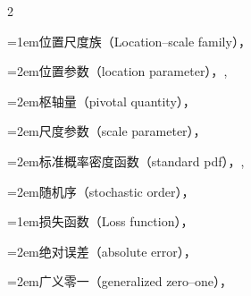 \begin{multicols}{2}
\par\addvspace{2pt}
\par\noindent\hangindent=1em\hspace*{0em}\label{idx:647}位置尺度族（Location–scale family），\hyperref[sec:3.5]{\pageref*{sec:3.5}}\par
\par\noindent\hangindent=2em\hspace*{1em}\label{idx:648}位置参数（location parameter），\hyperref[def:3.5.2]{\pageref*{def:3.5.2}}, \hyperref[def:3.5.5]{\pageref*{def:3.5.5}}\par
\par\noindent\hangindent=2em\hspace*{1em}\label{idx:649}枢轴量（pivotal quantity），\hyperref[ex:9.2.7]{\pageref*{ex:9.2.7}}\par
\par\noindent\hangindent=2em\hspace*{1em}\label{idx:650}尺度参数（scale parameter），\hyperref[def:3.5.4]{\pageref*{def:3.5.4}}\par
\par\noindent\hangindent=2em\hspace*{1em}\label{idx:651}标准概率密度函数（standard pdf），\hyperref[idxocc:651:126]{\pageref*{idxocc:651:126}}, \hyperref[def:3.5.5]{\pageref*{def:3.5.5}}\par
\par\noindent\hangindent=2em\hspace*{1em}\label{idx:652}随机序（stochastic order），\hyperref[exercise:8.34]{\pageref*{exercise:8.34}}\par
\par\addvspace{2pt}
\par\noindent\hangindent=1em\hspace*{0em}\label{idx:653}损失函数（Loss function），\hyperref[idxocc:653:313]{\pageref*{idxocc:653:313}}\par
\par\noindent\hangindent=2em\hspace*{1em}\label{idx:654}绝对误差（absolute error），\hyperref[ex:7.3.28]{\pageref*{ex:7.3.28}}\par
\par\noindent\hangindent=2em\hspace*{1em}\label{idx:655}广义零一（generalized zero–one），\hyperref[eq:8.3.11]{\pageref*{eq:8.3.11}}\par

\end{multicols}
